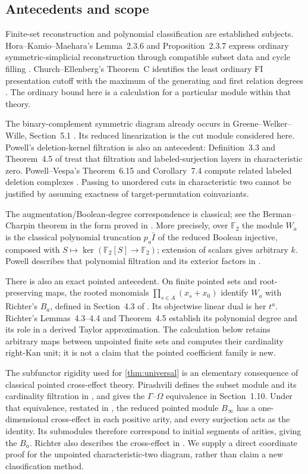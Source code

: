 \documentclass[11pt,a4paper]{article}
\theoremstyle{definition}
\theoremstyle{remark}
\newcommand{\Ftwo}{\mathbb F_2}
\begin{document}
\subsection{Antecedents and scope}

Finite-set reconstruction and polynomial classification are established subjects. Hora--Kamio--Maehara's Lemma~2.3.6 and Proposition~2.3.7 express ordinary symmetric-simplicial reconstruction through compatible subset data and cycle filling \cite{HKM}. Church--Ellenberg's Theorem~C identifies the least ordinary FI presentation cutoff with the maximum of the generating and first relation degrees \cite{CE}. The ordinary bound here is a calculation for a particular module within that theory.

The binary-complement symmetric diagram already occurs in Greene--Welker--Wille, Section~5.1 \cite{GWW}. Its reduced linearization is the cut module considered here. Powell's deletion-kernel filtration is also an antecedent: Definition~3.3 and Theorem~4.5 of \cite{PowellFilter} treat that filtration and labeled-surjection layers in characteristic zero. Powell--Vespa's Theorem~6.15 and Corollary~7.4 compute related labeled deletion complexes \cite{PV}. Passing to unordered cuts in characteristic two cannot be justified by assuming exactness of target-permutation coinvariants.

The augmentation/Boolean-degree correspondence is classical; see the Berman--Charpin theorem in the form proved in \cite[Theorem~3.6]{Andriatahiny}. More precisely, over $\Ftwo$ the module $W_a$ is the classical polynomial truncation $p_a\bar I$ of the reduced Boolean injective, composed with $S\mapsto\ker(\Ftwo[S]\to\Ftwo)$; extension of scalars gives arbitrary $k$. Powell describes that polynomial filtration and its exterior factors in \cite[Section~2]{Powell2000}.

There is also an exact pointed antecedent. On finite pointed sets and root-preserving maps, the rooted monomials $\prod_{s\in A}(x_s+x_0)$ identify $W_a$ with Richter's $B_a$, defined in Section~4.3 of \cite{Richter}. Its objectwise linear dual is her $t^a$. Richter's Lemmas~4.3--4.4 and Theorem~4.5 establish its polynomial degree and its role in a derived Taylor approximation. The calculation below retains arbitrary maps between unpointed finite sets and computes their cardinality right-Kan unit; it is not a claim that the pointed coefficient family is new.

The subfunctor rigidity used for \cref{thm:universal} is an elementary consequence of classical pointed cross-effect theory. Pirashvili defines the subset module and its cardinality filtration in \cite[Section~1.4]{Pirashvili}, and gives the $\Gamma$--$\Omega$ equivalence in Section~1.10. Under that equivalence, restated in \cite[Theorem~3.7]{PV}, the reduced pointed module $B_\infty$ has a one-dimensional cross-effect in each positive arity, and every surjection acts as the identity. Its submodules therefore correspond to initial segments of arities, giving the $B_a$. Richter also describes the cross-effect in \cite[Section~2.4]{Richter}. We supply a direct coordinate proof for the unpointed characteristic-two diagram, rather than claim a new classification method.
\end{document}
